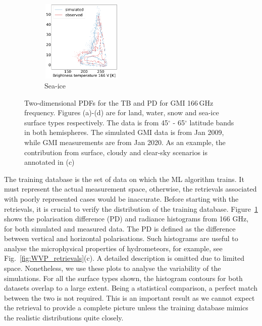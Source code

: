 \documentclass[12pt,oneside,a4paper]{article}
\begin{document}
\begin{figure}[t]
\begin{subfigure}{.24\textwidth}
	\caption{ Sea-ice}
	\includegraphics[height = 39mm, width = 39mm]{Figures/hist2d_gmi_highlat_sea-ice.pdf}
\end{subfigure}
	\caption{Two-dimensional PDFs for the TB and PD for GMI 166\,GHz frequency. Figures (a)-(d) are for land, water, snow and sea-ice surface types respectively. The data is from 45$^\circ$ - 65$^\circ$ latitude bands in both hemispheres. The simulated GMI data is from Jan 2009, while GMI measurements are from Jan 2020. As an example, the contribution from surface, cloudy and clear-sky scenarios is annotated in (c) }
	\label{fig:histogram_2d}
\end{figure}

The training database is the set of data on which the ML algorithm trains. It must represent the actual measurement space, otherwise, the retrievals associated with poorly represented cases would be inaccurate. Before starting with the retrievals, it is crucial to verify the distribution of the training database. Figure~\ref{fig:histogram_2d} shows the polarisation difference (PD) and radiance histograms from 166 GHz, for both simulated and measured data. The PD is defined as the difference between vertical and horizontal polarisations. Such histograms are useful to analyse the microphysical properties of hydrometeors, for example, see Fig.~\ref{fig:WVP_retrievals}(c). A detailed description is omitted due to limited space. Nonetheless, we use these plots to analyse the variability of the simulations. For all the surface types shown, the histogram contours for both datasets overlap to a large extent. Being a statistical comparison, a perfect match between the two is not required. This is an important result as we cannot expect the retrieval to provide a complete picture unless the training database mimics the realistic distributions quite closely.
\end{document}
